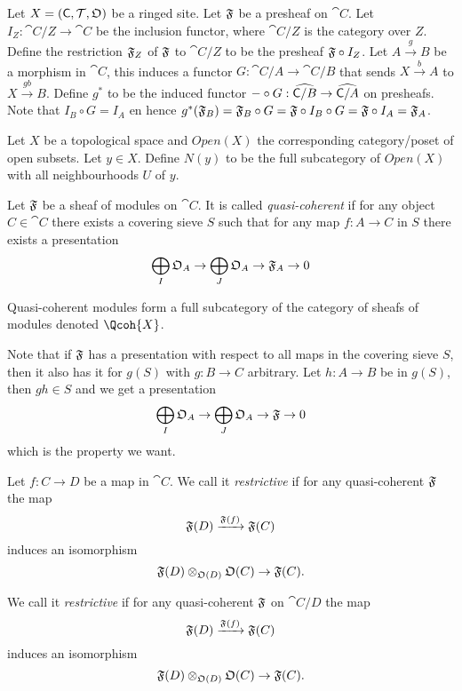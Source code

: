 


Let $X = ({\mathsf{C}},{\mathcal{T}},\mathfrak{O})$ be a ringed site.
Let $\mathfrak{F}$ be a presheaf on $\cat{C}$.
Let $I_Z: \cat{C}/Z \rightarrow \cat{C}$ be the inclusion functor, where $\cat{C}/Z$ is the category over $Z$.
Define the restriction $\mathfrak{F}_Z$ of $\mathfrak{F}$ to $\cat{C}/Z$ to be the presheaf $\mathfrak{F} \circ I_Z$.
Let $A \xrightarrow{g} B$ be a morphism in $\cat{C}$, 
this induces a functor $G:\cat{C}/A \rightarrow \cat{C}/B$ that sends $X\xrightarrow{b} A$ to $X\xrightarrow{gb} B$. 
Define $g^*$ to be the induced functor $ - \circ G: \widehat{{\mathsf{C}}/B} \rightarrow \widehat{{\mathsf{C}}/A}$ on presheafs. 
Note that $I_B \circ G = I_A$ en hence $g^*(\mathfrak{F}_B)= \mathfrak{F}_B \circ G = \mathfrak{F} \circ I_B \circ G = \mathfrak{F} \circ I_A =\mathfrak{F}_A$.

Let $X$ be a topological space and $Open(X)$ the corresponding category/poset of open subsets.
Let $y\in X$. Define $N(y)$ to be the full subcategory of $Open(X)$ with all neighbourhoods $U$ of $y$.

\begin{definition}
Let $\mathfrak{F}$ be a sheaf of modules on $\cat{C}$.
It is called \emph{quasi-coherent} if for any object $C\in\cat{C}$ 
there exists a covering sieve $S$ such that for any map $f:A\rightarrow C$ in $S$ there exists a presentation
\[\bigoplus_I \mathfrak{O}_A \rightarrow \bigoplus_J \mathfrak{O}_A \rightarrow \mathfrak{F}_A \rightarrow 0\]
\end{definition}

Quasi-coherent modules form a full subcategory of the category of sheafs of modules denoted $\Qcoh{X}$.

Note that if $\mathfrak{F}$ has a presentation with respect to all maps in the covering sieve $S$,
then it also has it for $g(S)$ with $g:B\rightarrow C$ arbitrary.
Let $h:A\rightarrow B$ be in $g(S)$, then $gh \in S$ and we get a presentation 
\[\bigoplus_I \mathfrak{O}_A \rightarrow \bigoplus_J \mathfrak{O}_A \rightarrow \mathfrak{F} \rightarrow 0\]
which is the property we want.





\begin{definition}
Let $f:C\rightarrow D$ be a map in $\cat{C}$.
We call it \emph{restrictive} if for any quasi-coherent $\mathfrak{F}$ the map
\[\mathfrak{F}(D)\xrightarrow{\mathfrak{F}(f)} \mathfrak{F}(C)\]
induces an isomorphism
\[\mathfrak{F}(D)\otimes_{\mathfrak{O}(D)}\mathfrak{O}(C) \rightarrow \mathfrak{F}(C).\]

We call it \emph{restrictive} if for any quasi-coherent $\mathfrak{F}$ on $\cat{C}/D$ the map
\[\mathfrak{F}(D)\xrightarrow{\mathfrak{F}(f)} \mathfrak{F}(C)\]
induces an isomorphism
\[\mathfrak{F}(D)\otimes_{\mathfrak{O}(D)}\mathfrak{O}(C) \rightarrow \mathfrak{F}(C).\]

\end{definition}



